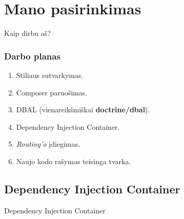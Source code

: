 \documentclass[12pt,a4paper]{beamer}
\begin{document}
\section{Mano pasirinkimas}
\begin{frame}[fragile]

    {\Huge Kaip dirbu aš?}
\end{frame}

\begin{frame}
    \frametitle{Darbo planas}
    \begin{enumerate}
        \item Stiliaus sutvarkymas.
        \item Composer paruošimas.
        \item DBAL (vienareikšmiškai \textbf{doctrine/dbal}).
        \item Dependency Injection Container.
        \item \textit{Routing'o} įdiegimas.
        \item Naujo kodo rašymas teisinga tvarka.
    \end{enumerate}
\end{frame}

\subsection{Dependency Injection Container}
\begin{frame}[fragile]

    {\Huge Dependency Injection Container}
\end{frame}
\end{document}
